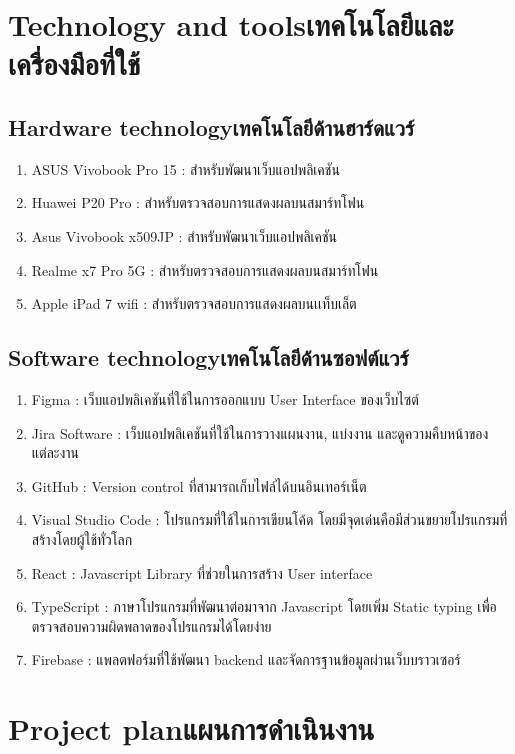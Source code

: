 \section{\ifenglish Technology and tools\else เทคโนโลยีและเครื่องมือที่ใช้\fi}

\subsection{\ifenglish Hardware technology\else เทคโนโลยีด้านฮาร์ดแวร์\fi}
\begin{enumerate}
    \item ASUS Vivobook Pro 15 : สำหรับพัฒนาเว็บแอปพลิเคชัน
    \item Huawei P20 Pro : สำหรับตรวจสอบการแสดงผลบนสมาร์ทโฟน
    \item Asus Vivobook x509JP : สำหรับพัฒนาเว็บแอปพลิเคชัน
    \item Realme x7 Pro 5G : สำหรับตรวจสอบการแสดงผลบนสมาร์ทโฟน
    \item Apple iPad 7 wifi : สำหรับตรวจสอบการแสดงผลบนเเท็บเล็ต
\end{enumerate}
\subsection{\ifenglish Software technology\else เทคโนโลยีด้านซอฟต์แวร์\fi}
\begin{enumerate}
    \item Figma : เว็บแอปพลิเคชันที่ใช้ในการออกแบบ User Interface ของเว็บไซต์
    \item Jira Software : เว็บแอปพลิเคชันที่ใช้ในการวางแผนงาน, แบ่งงาน และดูความคืบหน้าของแต่ละงาน
    \item GitHub : Version control ที่สามารถเก็บไฟล์ได้บนอินเทอร์เน็ต
    \item Visual Studio Code : โปรแกรมที่ใช้ในการเขียนโค้ด โดยมีจุดเด่นคือมีส่วนขยายโปรแกรมที่สร้างโดยผู้ใช้ทั่วโลก
    \item React : Javascript Library ที่ช่วยในการสร้าง User interface
    \item TypeScript : ภาษาโปรแกรมที่พัฒนาต่อมาจาก Javascript โดยเพิ่ม Static typing เพื่อตรวจสอบความผิดพลาดของโปรแกรมได้โดยง่าย
    \item Firebase : แพลตฟอร์มที่ใช้พัฒนา backend และจัดการฐานข้อมูลผ่านเว็บบราวเซอร์
\end{enumerate}
\section{\ifenglish Project plan\else แผนการดำเนินงาน\fi}

